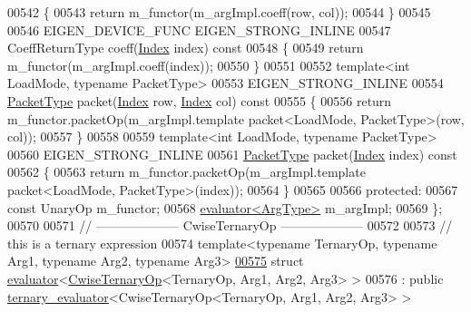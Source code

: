 \begin{DoxyCode}
00542 \textcolor{keyword}{  }\{
00543     \textcolor{keywordflow}{return} m\_functor(m\_argImpl.coeff(row, col));
00544   \}
00545 
00546   EIGEN\_DEVICE\_FUNC EIGEN\_STRONG\_INLINE
00547   CoeffReturnType coeff(\hyperlink{namespace_eigen_a62e77e0933482dafde8fe197d9a2cfde}{Index} index)\textcolor{keyword}{ const}
00548 \textcolor{keyword}{  }\{
00549     \textcolor{keywordflow}{return} m\_functor(m\_argImpl.coeff(index));
00550   \}
00551 
00552   \textcolor{keyword}{template}<\textcolor{keywordtype}{int} LoadMode, \textcolor{keyword}{typename} PacketType>
00553   EIGEN\_STRONG\_INLINE
00554   \hyperlink{struct_eigen_1_1_packet_type}{PacketType} packet(\hyperlink{namespace_eigen_a62e77e0933482dafde8fe197d9a2cfde}{Index} row, \hyperlink{namespace_eigen_a62e77e0933482dafde8fe197d9a2cfde}{Index} col)\textcolor{keyword}{ const}
00555 \textcolor{keyword}{  }\{
00556     \textcolor{keywordflow}{return} m\_functor.packetOp(m\_argImpl.template packet<LoadMode, PacketType>(row, col));
00557   \}
00558 
00559   \textcolor{keyword}{template}<\textcolor{keywordtype}{int} LoadMode, \textcolor{keyword}{typename} PacketType>
00560   EIGEN\_STRONG\_INLINE
00561   \hyperlink{struct_eigen_1_1_packet_type}{PacketType} packet(\hyperlink{namespace_eigen_a62e77e0933482dafde8fe197d9a2cfde}{Index} index)\textcolor{keyword}{ const}
00562 \textcolor{keyword}{  }\{
00563     \textcolor{keywordflow}{return} m\_functor.packetOp(m\_argImpl.template packet<LoadMode, PacketType>(index));
00564   \}
00565 
00566 \textcolor{keyword}{protected}:
00567   \textcolor{keyword}{const} UnaryOp m\_functor;
00568   \hyperlink{struct_eigen_1_1internal_1_1evaluator}{evaluator<ArgType>} m\_argImpl;
00569 \};
00570 
00571 \textcolor{comment}{// -------------------- CwiseTernaryOp --------------------}
00572 
00573 \textcolor{comment}{// this is a ternary expression}
00574 \textcolor{keyword}{template}<\textcolor{keyword}{typename} TernaryOp, \textcolor{keyword}{typename} Arg1, \textcolor{keyword}{typename} Arg2, \textcolor{keyword}{typename} Arg3>
\hyperlink{struct_eigen_1_1internal_1_1evaluator_3_01_cwise_ternary_op_3_01_ternary_op_00_01_arg1_00_01_arg2_00_01_arg3_01_4_01_4}{00575} \textcolor{keyword}{struct }\hyperlink{struct_eigen_1_1internal_1_1evaluator}{evaluator}<\hyperlink{group___core___module_class_eigen_1_1_cwise_ternary_op}{CwiseTernaryOp}<TernaryOp, Arg1, Arg2, Arg3> >
00576   : \textcolor{keyword}{public} \hyperlink{struct_eigen_1_1internal_1_1ternary__evaluator}{ternary\_evaluator}<CwiseTernaryOp<TernaryOp, Arg1, Arg2, Arg3> >

\end{DoxyCode}
